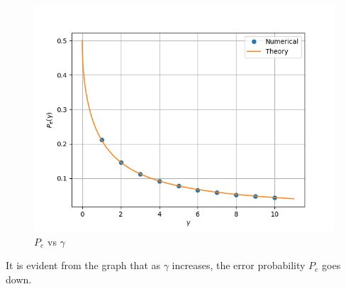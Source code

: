 \documentclass[journal,12pt,twocolumn]{IEEEtran}
\renewcommand\thesection{\arabic{section}}
\begin{document}
\begin{enumerate}[label=\thesection.\arabic*
,ref=\thesection.\theenumi]
\begin{figure}
    \centering
    \includegraphics[width=\columnwidth]{./figures/ErrorGraph2.png}
    \caption{$P_e$ vs $\gamma$}
    \label{fig:ErrorGraph2}
    \end{figure}

It is evident from the graph that as $\gamma$ increases, the error probability $P_e$ goes down. 
		\end{enumerate}
\end{document}
